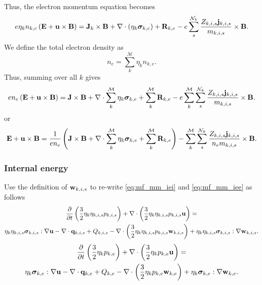 \documentclass[a4paper,11pt]{report}
\begin{document}
Thus, the electron momentum equation becomes
\begin{equation*}
    e \eta_k n_{k,e} \left( \mathbf{E} + \mathbf{u} \times \mathbf{B} \right) = \mathbf{J}_k \times \mathbf{B} + \nabla \cdot \left( \eta_k \bm \sigma_{k,e} \right) + \mathbf{R}_{k,e} - e \sum_s^{\mathcal{N}_k} \frac{Z_{k,i,s} \mathbf{j}_{k,i,s}}{m_{k,i,s}} \times \mathbf{B}.
\end{equation*}
We define the total electron density as 
\begin{equation*}
    n_e = \sum_k^\mathcal{M} \eta_k n_{k,e}.
\end{equation*}
Thus, summing over all $k$ gives
\begin{equation*}
    e n_e \left( \mathbf{E} + \mathbf{u} \times \mathbf{B} \right) = \mathbf{J} \times \mathbf{B} + \nabla \cdot \sum_k^\mathcal{M} \eta_k \bm \sigma_{k,e} + \sum_k^\mathcal{M} \mathbf{R}_{k,e} - e \sum_k^\mathcal{M} \sum_s^{\mathcal{N}_k} \frac{Z_{k,i,s} \mathbf{j}_{k,i,s}}{m_{k,i,s}} \times \mathbf{B}.
\end{equation*}
or
\begin{equation}
    \mathbf{E} + \mathbf{u} \times \mathbf{B} = \frac{1}{e n_e} \left( \mathbf{J} \times \mathbf{B} + \nabla \cdot \sum_k^\mathcal{M} \eta_k \bm \sigma_{k,e} + \sum_k^\mathcal{M} \mathbf{R}_{k,e} \right) - \sum_k^\mathcal{M} \sum_s^{\mathcal{N}_k} \frac{Z_{k,i,s} \mathbf{j}_{k,i,s}}{n_e m_{k,i,s}} \times \mathbf{B}.
\end{equation}

\subsubsection{Internal energy}

Use the definition of $\mathbf{w}_{k,i,s}$ to re-write \cref{eq:mf_mm_iei} and \cref{eq:mf_mm_iee} as follows
\begin{multline*}
    \frac{\partial}{\partial t} \left( \frac{3}{2} \eta_k \eta_{k,i,s} p_{k,i,s} \right) + \nabla \cdot \left( \frac{3}{2} \eta_k \eta_{k,i,s} p_{k,i,s} \mathbf{u} \right) = \\
    \eta_k \eta_{k,i,s} \bm \sigma_{k,i,s} : \nabla \mathbf{u} - \nabla \cdot \mathbf{q}_{k,i,s} + Q_{k,i,s} - \nabla \cdot \left( \frac{3}{2} \eta_k \eta_{k,i,s} p_{k,i,s} \mathbf{w}_{k,i,s} \right) + \eta_k \eta_{k,i,s} \bm \sigma_{k,i,s} : \nabla \mathbf{w}_{k,i,s} .
\end{multline*}
\begin{multline*}
    \frac{\partial}{\partial t} \left( \frac{3}{2} \eta_k p_{k,e} \right) + \nabla \cdot \left( \frac{3}{2} \eta_k p_{k,e} \mathbf{u} \right) = \\
    \eta_k \bm \sigma_{k,e} : \nabla \mathbf{u} - \nabla \cdot \mathbf{q}_{k,e} + Q_{k,e} - \nabla \cdot \left( \frac{3}{2} \eta_k p_{k,e} \mathbf{w}_{k,e} \right) + \eta_k \bm \sigma_{k,e} : \nabla \mathbf{w}_{k,e}.
\end{multline*}
\end{document}
